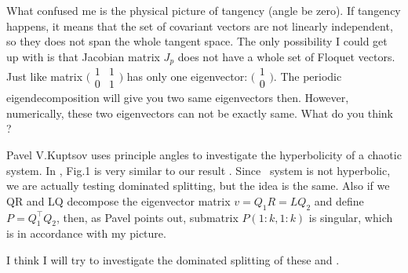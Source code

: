 \begin{description}
  What confused me is the physical picture of tangency (angle be zero).
  If tangency happens, it means that the set of covariant vectors are not
  linearly independent, so they does not span the whole tangent space.
  The only possibility I could get up with is that Jacobian matrix $J_p$
  does not have a whole set of Floquet vectors. Just like matrix
  $\bigl(\begin{smallmatrix}
    1&1\\ 0&1
  \end{smallmatrix} \bigr)$
  has only one eigenvector:
  $\bigl(\begin{smallmatrix}
    1\\ 0
  \end{smallmatrix} \bigr)$.
  The periodic eigendecomposition will give you two same eigenvectors then.
  However, numerically, these two eigenvectors can not be exactly same.
  What do you think ?

  Pavel V.Kuptsov uses principle angles to investigate the hyperbolicity
  of a chaotic system. In , Fig.1 is very similar to our
  result . Since \KS\ system is not
  hyperbolic, we are actually testing dominated splitting, but the idea is the
  same. Also if we QR and LQ decompose the eigenvector matrix $v=Q_1R=LQ_2$ and
  define $P=Q_1^\top Q_2$, then, as Pavel points out,
  submatrix $P(1:k,1:k)$ is singular, which is in accordance with my picture.

  I think I will try to investigate the dominated splitting of these 
  and .


\end{description}
